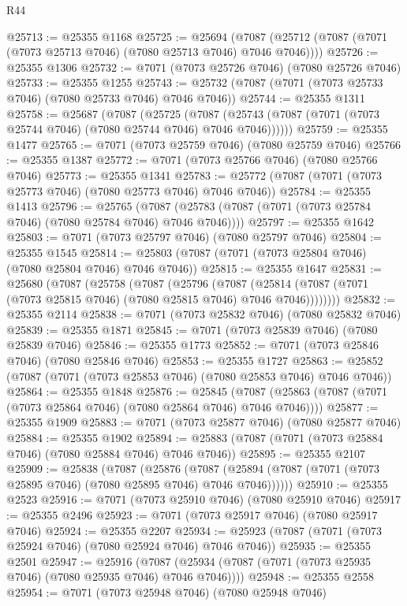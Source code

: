 \begin{lexlean}{R44}
\begin{coremodule}
{@25713 := @25355 @1168
@25725 := @25694
    (@7087 (@25712 (@7087 (@7071 (@7073 @25713 @7046) (@7080 @25713 @7046) @7046 @7046))))
@25726 := @25355 @1306
@25732 := @7071 (@7073 @25726 @7046) (@7080 @25726 @7046)
@25733 := @25355 @1255
@25743 := @25732 (@7087 (@7071 (@7073 @25733 @7046) (@7080 @25733 @7046) @7046 @7046))
@25744 := @25355 @1311
@25758 := @25687
    (@7087
      (@25725
        (@7087 (@25743 (@7087 (@7071 (@7073 @25744 @7046) (@7080 @25744 @7046) @7046 @7046))))))
@25759 := @25355 @1477
@25765 := @7071 (@7073 @25759 @7046) (@7080 @25759 @7046)
@25766 := @25355 @1387
@25772 := @7071 (@7073 @25766 @7046) (@7080 @25766 @7046)
@25773 := @25355 @1341
@25783 := @25772 (@7087 (@7071 (@7073 @25773 @7046) (@7080 @25773 @7046) @7046 @7046))
@25784 := @25355 @1413
@25796 := @25765
    (@7087 (@25783 (@7087 (@7071 (@7073 @25784 @7046) (@7080 @25784 @7046) @7046 @7046))))
@25797 := @25355 @1642
@25803 := @7071 (@7073 @25797 @7046) (@7080 @25797 @7046)
@25804 := @25355 @1545
@25814 := @25803 (@7087 (@7071 (@7073 @25804 @7046) (@7080 @25804 @7046) @7046 @7046))
@25815 := @25355 @1647
@25831 := @25680
    (@7087
      (@25758
        (@7087
          (@25796
            (@7087
              (@25814 (@7087 (@7071 (@7073 @25815 @7046) (@7080 @25815 @7046) @7046 @7046))))))))
@25832 := @25355 @2114
@25838 := @7071 (@7073 @25832 @7046) (@7080 @25832 @7046)
@25839 := @25355 @1871
@25845 := @7071 (@7073 @25839 @7046) (@7080 @25839 @7046)
@25846 := @25355 @1773
@25852 := @7071 (@7073 @25846 @7046) (@7080 @25846 @7046)
@25853 := @25355 @1727
@25863 := @25852 (@7087 (@7071 (@7073 @25853 @7046) (@7080 @25853 @7046) @7046 @7046))
@25864 := @25355 @1848
@25876 := @25845
    (@7087 (@25863 (@7087 (@7071 (@7073 @25864 @7046) (@7080 @25864 @7046) @7046 @7046))))
@25877 := @25355 @1909
@25883 := @7071 (@7073 @25877 @7046) (@7080 @25877 @7046)
@25884 := @25355 @1902
@25894 := @25883 (@7087 (@7071 (@7073 @25884 @7046) (@7080 @25884 @7046) @7046 @7046))
@25895 := @25355 @2107
@25909 := @25838
    (@7087
      (@25876
        (@7087 (@25894 (@7087 (@7071 (@7073 @25895 @7046) (@7080 @25895 @7046) @7046 @7046))))))
@25910 := @25355 @2523
@25916 := @7071 (@7073 @25910 @7046) (@7080 @25910 @7046)
@25917 := @25355 @2496
@25923 := @7071 (@7073 @25917 @7046) (@7080 @25917 @7046)
@25924 := @25355 @2207
@25934 := @25923 (@7087 (@7071 (@7073 @25924 @7046) (@7080 @25924 @7046) @7046 @7046))
@25935 := @25355 @2501
@25947 := @25916
    (@7087 (@25934 (@7087 (@7071 (@7073 @25935 @7046) (@7080 @25935 @7046) @7046 @7046))))
@25948 := @25355 @2558
@25954 := @7071 (@7073 @25948 @7046) (@7080 @25948 @7046)
}
\end{coremodule}
\end{lexlean}
